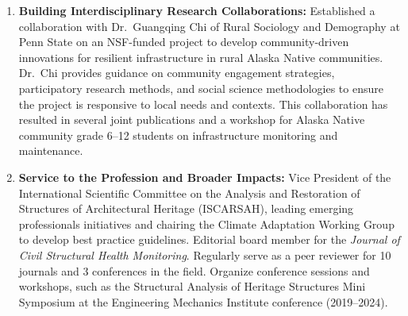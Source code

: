\documentclass[11pt]{article}
\begin{document}
\begin{enumerate}[leftmargin=*, labelsep=0.5em, itemsep=0.4cm]
\item \textbf{Building Interdisciplinary Research Collaborations:}
Established a collaboration with Dr.\ Guangqing Chi of Rural Sociology and
Demography at Penn State on an NSF-funded project to develop community-driven
innovations for resilient infrastructure in rural Alaska Native communities.
Dr.\ Chi provides guidance on community engagement strategies, participatory
research methods, and social science methodologies to ensure the project is
responsive to local needs and contexts. This collaboration has resulted in
several joint publications and a workshop for Alaska Native community grade
6--12 students on infrastructure monitoring and maintenance.

\item \textbf{Service to the Profession and Broader Impacts:}
Vice President of the International Scientific Committee on the Analysis and
Restoration of Structures of Architectural Heritage (ISCARSAH), leading
emerging professionals initiatives and chairing the Climate Adaptation Working
Group to develop best practice guidelines. Editorial board member for the
\textit{Journal of Civil Structural Health Monitoring}. Regularly serve as a
peer reviewer for 10 journals and 3 conferences in the field. Organize
conference sessions and workshops, such as the Structural Analysis of Heritage
Structures Mini Symposium at the Engineering Mechanics Institute conference
(2019--2024).

\end{enumerate}
\end{document}
